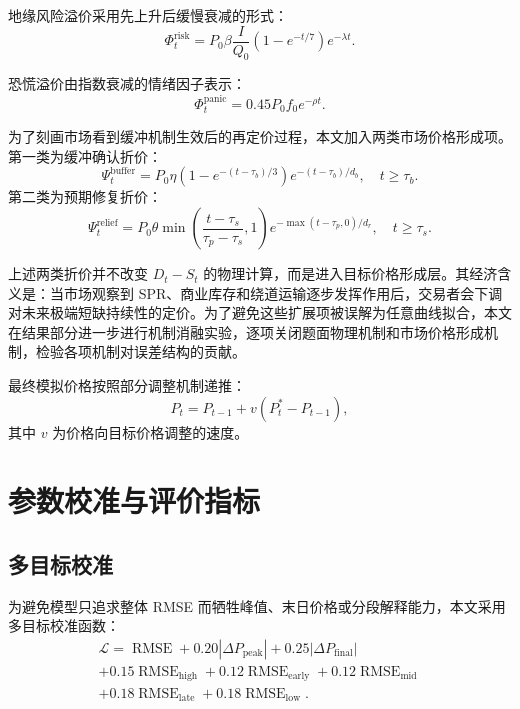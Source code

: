 \documentclass[UTF8,zihao=-4,fontset=fandol]{ctexart}
\begin{document}
地缘风险溢价采用先上升后缓慢衰减的形式：
\begin{equation}
\Phi_t^{\mathrm{risk}}
  =
  P_0
  \beta
  \frac{I}{Q_0}
  \left(1-e^{-t/7}\right)e^{-\lambda t}.
\end{equation}

恐慌溢价由指数衰减的情绪因子表示：
\begin{equation}
\Phi_t^{\mathrm{panic}}
  =
  0.45P_0 f_0 e^{-\rho t}.
\end{equation}

为了刻画市场看到缓冲机制生效后的再定价过程，本文加入两类市场价格形成项。第一类为缓冲确认折价：
\begin{equation}
\Psi_t^{\mathrm{buffer}}
  =
  P_0 \eta
  \left(1-e^{-(t-\tau_b)/3}\right)
  e^{-(t-\tau_b)/d_b},
  \quad t \ge \tau_b.
\end{equation}
第二类为预期修复折价：
\begin{equation}
\Psi_t^{\mathrm{relief}}
  =
  P_0 \theta
  \min\left(
  \frac{t-\tau_s}{\tau_p-\tau_s}, 1
  \right)
  e^{-\max(t-\tau_p,0)/d_r},
  \quad t \ge \tau_s.
\end{equation}

上述两类折价并不改变 \(D_t-S_t\) 的物理计算，而是进入目标价格形成层。其经济含义是：当市场观察到 SPR、商业库存和绕道运输逐步发挥作用后，交易者会下调对未来极端短缺持续性的定价。为了避免这些扩展项被误解为任意曲线拟合，本文在结果部分进一步进行机制消融实验，逐项关闭题面物理机制和市场价格形成机制，检验各项机制对误差结构的贡献。

最终模拟价格按照部分调整机制递推：
\begin{equation}
P_t
  =
  P_{t-1}
  +
  v(P_t^{*}-P_{t-1}),
\end{equation}
其中 \(v\) 为价格向目标价格调整的速度。

\section{参数校准与评价指标}

\subsection{多目标校准}

为避免模型只追求整体 RMSE 而牺牲峰值、末日价格或分段解释能力，本文采用多目标校准函数：
\begin{equation}
\begin{gathered}
\mathcal{L}=
\operatorname{RMSE}
+0.20|\Delta P_{\mathrm{peak}}|
+0.25|\Delta P_{\mathrm{final}}| \\
+0.15\operatorname{RMSE}_{\mathrm{high}}
+0.12\operatorname{RMSE}_{\mathrm{early}}
+0.12\operatorname{RMSE}_{\mathrm{mid}} \\
+0.18\operatorname{RMSE}_{\mathrm{late}}
+0.18\operatorname{RMSE}_{\mathrm{low}} .
\end{gathered}
\end{equation}
\end{document}
